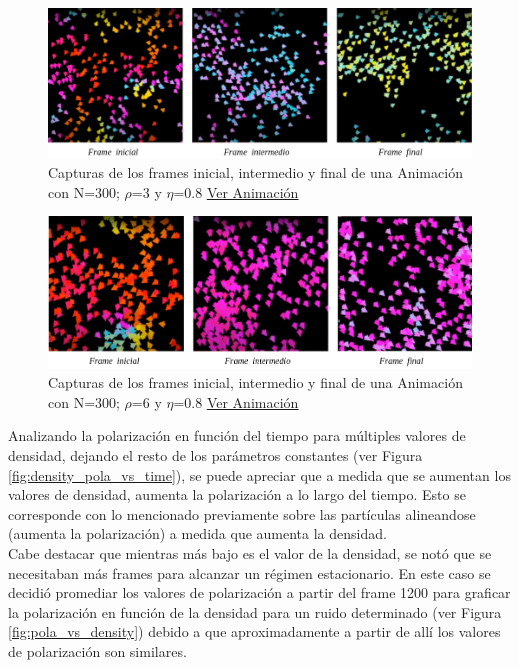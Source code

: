 \documentclass[12pt, a4paper]{report}
\begin{document}
\begin{figure}[h]
\includegraphics[scale=0.4]{density_N300_n08_d3.png}
\centering 
\caption{Capturas de los frames inicial, intermedio y final de una Animación con N=300; $\rho$=3 y $\eta$=0.8 \href{https://www.youtube.com/watch?v=Ez3LWEwRvmk}{\underline{Ver Animación}}}
\label{fig:density_N300_n08_d3}
\end{figure}

\pagebreak
\begin{figure}[h]
\includegraphics[scale=0.4]{density_N300_n08_d6.png}
\centering 
\caption{Capturas de los frames inicial, intermedio y final de una Animación con N=300; $\rho$=6 y $\eta$=0.8 \href{https://youtu.be/yM9k2Y_oSKs}{\underline{Ver Animación}}} 
\label{fig:density_N300_n08_d6}
\end{figure}

Analizando la polarización en función del tiempo para múltiples valores de densidad, dejando el resto de los parámetros constantes (ver Figura \ref{fig:density_pola_vs_time}), se puede apreciar que a medida que se aumentan los valores de densidad, aumenta la polarización a lo largo del tiempo. Esto se corresponde con lo mencionado previamente sobre las partículas alineandose (aumenta la polarización) a medida que aumenta la densidad.\\

Cabe destacar que mientras más bajo es el valor de la densidad, se notó que se necesitaban más frames para alcanzar un régimen estacionario. En este caso se decidió promediar los valores de polarización a partir del frame 1200 para graficar la polarización en función de la densidad para un ruido determinado (ver Figura \ref{fig:pola_vs_density}) debido a que aproximadamente a partir de allí los valores de polarización son similares.\\
\end{document}
